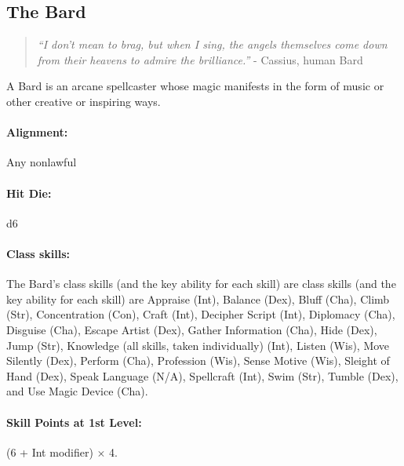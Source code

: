 \subsection[Bard]{The Bard}
\label{sec:Bard}
\begin{quote}
\emph{``I don't mean to brag, but when I sing, the angels themselves come down from their heavens to admire the brilliance.''}
- Cassius, human Bard
\end{quote}
A Bard is an arcane spellcaster whose magic manifests in the form of music or other creative or inspiring ways.
\paragraph{Alignment:} Any nonlawful
\paragraph{Hit Die:} d6
\paragraph{Class skills:}
The Bard's class skills (and the key ability for each skill) are 
class skills (and the key ability for each skill) are Appraise (Int), Balance (Dex), Bluff (Cha), Climb (Str), Concentration (Con), Craft (Int), Decipher Script (Int), Diplomacy (Cha), Disguise (Cha), Escape Artist (Dex), Gather Information (Cha), Hide (Dex), Jump (Str), Knowledge (all skills, taken individually) (Int), Listen (Wis), Move Silently (Dex), Perform (Cha), Profession (Wis), Sense Motive (Wis), Sleight of Hand (Dex), Speak Language (N/A), Spellcraft (Int), Swim (Str), Tumble (Dex), and Use Magic Device (Cha).
\paragraph{Skill Points at 1st Level:} (6 + Int modifier) $\times$ 4.
